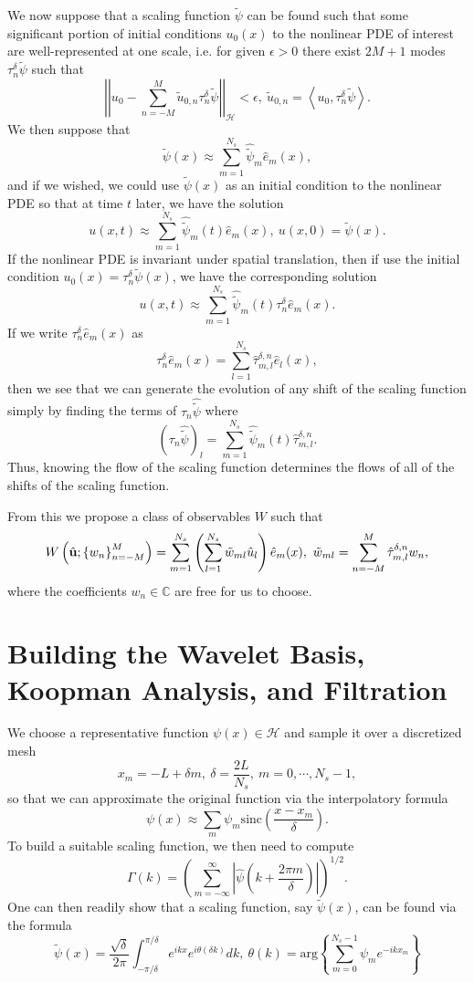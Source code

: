 \documentclass[a4paper,11pt]{article}
\newcommand{\gnorm}[1]{\left|\left| #1\right|\right|}
\begin{document}
We now suppose that a scaling function $\tilde{\psi}$ can be found such that some significant portion of initial conditions $u_{0}(x)$ to the nonlinear PDE of interest are well-represented at one scale, i.e. for given $\epsilon > 0$  there exist $2M+1$ modes $\tau^{\delta }_{n}\tilde{\psi}$ such that 
\[
\gnorm{u_{0} - \sum_{n=-M}^{M}\tilde{u}_{0,n}\tau^{\delta}_{n}\tilde{\psi}}_{\mathcal{H}} < \epsilon, ~ \tilde{u}_{0,n} = \left<u_{0}, \tau^{\delta}_{n}\tilde{\psi}\right>. 
\]
We then suppose that 
\[
\tilde{\psi}(x) \approx \sum_{m=1}^{N_{s}}\hat{\tilde{\psi}}_{m}\hat{e}_{m}(x),
\]
and if we wished, we could use $\tilde{\psi}(x)$ as an initial condition to the nonlinear PDE so that at time $t$ later, we have the solution 
\[
u(x,t) \approx \sum_{m=1}^{N_{s}}\hat{\tilde{\psi}}_{m}(t)\hat{e}_{m}(x), ~ u(x,0) = \tilde{\psi}(x).
\]
If the nonlinear PDE is invariant under spatial translation, then if use the initial condition $u_{0}(x) = \tau_{n}^{\delta}\tilde{\psi}(x)$, we have the corresponding solution 
\[
u(x,t) \approx \sum_{m=1}^{N_{s}} \hat{\tilde{\psi}}_{m}(t)\tau_{n}^{\delta}\hat{e}_{m}(x).
\]
If we write $\tau_{n}^{\delta}\hat{e}_{m}(x)$ as 
\[
\tau_{n}^{\delta}\hat{e}_{m}(x) = \sum_{l=1}^{N_{s}}\hat{\tau}^{\delta,n}_{m,l}\hat{e}_{l}(x),
\]
then we see that we can generate the evolution of any shift of the scaling function simply by finding the terms of $\tau_{n}\hat{\tilde{\psi}}$ where 
\[
\left(\tau_{n}\hat{\tilde{\psi}}\right)_{l} = \sum_{m=1}^{N_{s}}\hat{\tilde{\psi}}_{m}(t)\hat{\tau}^{\delta,n}_{m,l}.
\]
Thus, knowing the flow of the scaling function determines the flows of all of the shifts of the scaling function.  

From this we propose a class of observables $W$ such that 
\[
W\left(\hat{{\bf u}} ; \left\{w_{n}\right\}_{n=-M}^{M}\right) = \sum_{m=1}^{N_{s}}\left(\sum_{l=1}^{N_{s}}\tilde{w}_{ml}\hat{u}_{l}\right)\hat{e}_{m}(x), ~ \tilde{w}_{ml} = \sum_{n=-M}^{M}\hat{\tau}^{\delta,n}_{m,l}w_{n},
\]
where the coefficients $w_{n}\in \mathbb{C}$ are free for us to choose. 

\section*{Building the Wavelet Basis, Koopman Analysis, and Filtration}
We choose a representative function $\psi(x)\in \mathcal{H}$ and sample it over a discretized mesh 
\[
x_{m} = -L + \delta m, ~\delta = \frac{2L}{N_{s}}, ~m=0,\cdots,N_{s}-1, 
\]
so that we can approximate the original function via the interpolatory formula
\[
\psi(x) \approx \sum_{m}\psi_{m}\mbox{sinc}\left(\frac{x-x_{m}}{\delta} \right).
\]
To build a suitable scaling function, we then need to compute 
\[
\Gamma(k) = \left(\sum_{m=-\infty}^{\infty}\left|\hat{\psi}\left(k + \frac{2\pi m}{\delta} \right) \right| \right)^{1/2}.
\]
One can then readily show that a scaling function, say $\tilde{\psi}(x)$, can be found via the formula 
\[
\tilde{\psi}(x) = \frac{\sqrt{\delta}}{2\pi}\int_{-\pi/\delta}^{\pi/\delta}e^{ikx} e^{i\theta(\delta k)} dk, ~ \theta(k) = \mbox{arg}\left\{ \sum_{m=0}^{N_{s}-1}\psi_{m}e^{-ik x_{m}}\right\} 
\]
\end{document}
